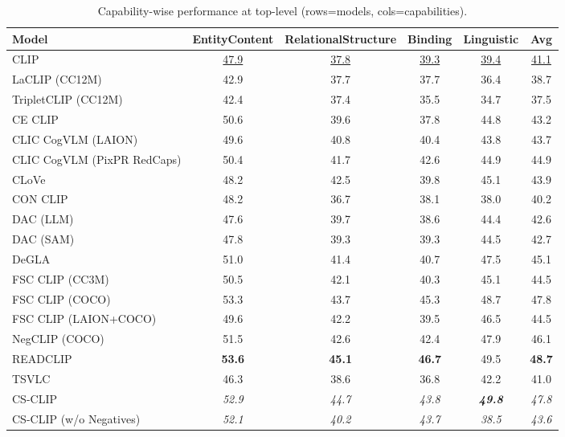 \begin{table}[t]
  \centering
  \scriptsize
  \caption{Capability-wise performance at top-level (rows=models, cols=capabilities).}
  \label{tab:caps_top}
  \begin{adjustbox}{max width=\textwidth}
  \setlength{\tabcolsep}{2pt}
  \begin{tabular}{p{5.0cm}ccccc}
    \toprule
    Model & EntityContent & RelationalStructure & Binding & Linguistic & Avg \\
    \midrule
    CLIP & \underline{47.9} & \underline{37.8} & \underline{39.3} & \underline{39.4} & \underline{41.1} \\
    \midrule
    LaCLIP (CC12M) & 42.9 & 37.7 & 37.7 & 36.4 & 38.7 \\
    TripletCLIP (CC12M) & 42.4 & 37.4 & 35.5 & 34.7 & 37.5 \\
    \midrule
    CE CLIP & 50.6 & 39.6 & 37.8 & 44.8 & 43.2 \\
    CLIC CogVLM (LAION) & 49.6 & 40.8 & 40.4 & 43.8 & 43.7 \\
    CLIC CogVLM (PixPR RedCaps) & 50.4 & 41.7 & 42.6 & 44.9 & 44.9 \\
    CLoVe & 48.2 & 42.5 & 39.8 & 45.1 & 43.9 \\
    CON CLIP & 48.2 & 36.7 & 38.1 & 38.0 & 40.2 \\
    DAC (LLM) & 47.6 & 39.7 & 38.6 & 44.4 & 42.6 \\
    DAC (SAM) & 47.8 & 39.3 & 39.3 & 44.5 & 42.7 \\
    DeGLA & 51.0 & 41.4 & 40.7 & 47.5 & 45.1 \\
    FSC CLIP (CC3M) & 50.5 & 42.1 & 40.3 & 45.1 & 44.5 \\
    FSC CLIP (COCO) & 53.3 & 43.7 & 45.3 & 48.7 & 47.8 \\
    FSC CLIP (LAION+COCO) & 49.6 & 42.2 & 39.5 & 46.5 & 44.5 \\
    NegCLIP (COCO) & 51.5 & 42.6 & 42.4 & 47.9 & 46.1 \\
    READCLIP & \textbf{53.6} & \textbf{45.1} & \textbf{46.7} & 49.5 & \textbf{48.7} \\
    TSVLC & 46.3 & 38.6 & 36.8 & 42.2 & 41.0 \\
    \midrule
    CS-CLIP & \emph{52.9} & \emph{44.7} & \emph{43.8} & \textbf{\emph{49.8}} & \emph{47.8} \\
    CS-CLIP (w/o Negatives) & \emph{52.1} & \emph{40.2} & \emph{43.7} & \emph{38.5} & \emph{43.6} \\
    \bottomrule
  \end{tabular}
  \end{adjustbox}
\end{table}

